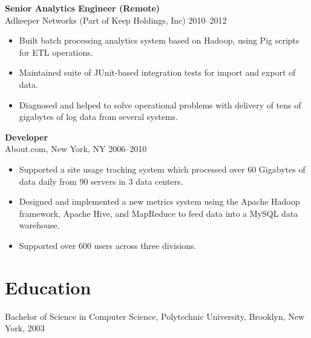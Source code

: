 \documentclass[margin]{res}
\begin{document}
\begin{resume}
{\bf Senior Analytics Engineer (Remote)}\\
Adkeeper Networks (Part of Keep Holdings, Inc) \hfill  2010--2012
\begin{itemize}
  \item Built batch processing analytics system based on Hadoop, using Pig
      scripts for ETL operations.
  \item Maintained suite of JUnit-based integration tests for import and
      export of data.
  \item Diagnosed and helped to solve operational problems with delivery of
      tens of gigabytes of log data from several systems.
\end{itemize}

{\bf Developer}\\
About.com, New York, NY \hfill  2006--2010
\begin{itemize}
  \item Supported a site usage tracking system which processed
    over 60 Gigabytes of data daily from 90 servers in 3 data centers.
  \item Designed and implemented a new metrics system using the Apache
    Hadoop framework, Apache Hive, and MapReduce to feed data into a MySQL data
    warehouse.
  \item Supported over 600 users across three divisions.
\end{itemize}

\section{Education}
Bachelor of Science in Computer Science, Polytechnic University, Brooklyn, New
York, 2003

\end{resume}
\end{document}
